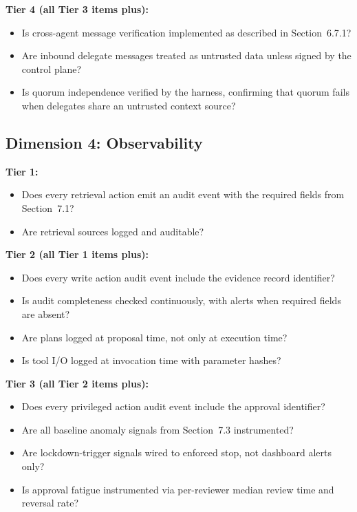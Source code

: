 \documentclass[11pt]{article}
\begin{document}
\textbf{Tier 4 (all Tier 3 items plus):}
\begin{itemize}
  \item Is cross-agent message verification implemented as described in Section~6.7.1?
  \item Are inbound delegate messages treated as untrusted data unless signed by the control plane?
  \item Is quorum independence verified by the harness, confirming that quorum fails when delegates share an untrusted context source?
\end{itemize}

\subsection{Dimension 4: Observability}

\textbf{Tier 1:}
\begin{itemize}
  \item Does every retrieval action emit an audit event with the required fields from Section~7.1?
  \item Are retrieval sources logged and auditable?
\end{itemize}

\textbf{Tier 2 (all Tier 1 items plus):}
\begin{itemize}
  \item Does every write action audit event include the evidence record identifier?
  \item Is audit completeness checked continuously, with alerts when required fields are absent?
  \item Are plans logged at proposal time, not only at execution time?
  \item Is tool I/O logged at invocation time with parameter hashes?
\end{itemize}

\textbf{Tier 3 (all Tier 2 items plus):}
\begin{itemize}
  \item Does every privileged action audit event include the approval identifier?
  \item Are all baseline anomaly signals from Section~7.3 instrumented?
  \item Are lockdown-trigger signals wired to enforced stop, not dashboard alerts only?
  \item Is approval fatigue instrumented via per-reviewer median review time and reversal rate?
\end{itemize}
\end{document}
